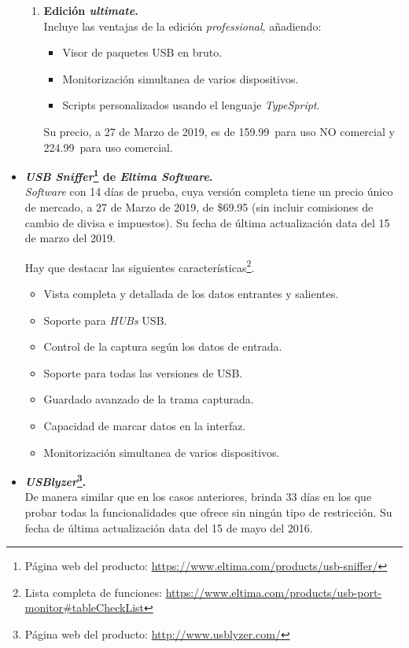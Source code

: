 \begin{itemize}
\begin{enumerate}
        \item \textbf{Edición \emph{ultimate}.} \\
        Incluye las ventajas de la edición \emph{professional}, añadiendo:
        \begin{itemize}
            \item Visor de paquetes USB en bruto.
            \item Monitorización simultanea de varios dispositivos.
            \item Scripts personalizados usando el lenguaje \emph{TypeSpript}.
        \end{itemize}
        Su precio, a 27 de Marzo de 2019, es de 159.99\texteuro ~para uso NO comercial y 224.99\texteuro ~para uso comercial.
    \end{enumerate}

    \item \textbf{\emph{USB Sniffer}\footnote{Página web del producto: \url{https://www.eltima.com/products/usb-sniffer/}} de \emph{Eltima Software}.} \\
    \emph{Software} con 14 días de prueba, cuya versión completa tiene un precio único de mercado, a 27 de Marzo de 2019, de \$69.95 (sin incluir comisiones de cambio de divisa e impuestos). Su fecha de última actualización data del 15 de marzo del 2019.
    
    Hay que destacar las siguientes características\footnote{Lista completa de funciones: \url{https://www.eltima.com/products/usb-port-monitor\#tableCheckList}}.

    \begin{itemize}
        \item Vista completa y detallada de los datos entrantes y salientes.
        \item Soporte para \emph{HUBs} USB.
        \item Control de la captura según los datos de entrada.
        \item Soporte para todas las versiones de USB.
        \item Guardado avanzado de la trama capturada.
        \item Capacidad de marcar datos en la interfaz.
        \item Monitorización simultanea de varios dispositivos.
    \end{itemize}

    \item \textbf{\emph{USBlyzer}\footnote{Página web del producto: \url{http://www.usblyzer.com/}}.} \\
    De manera similar que en los casos anteriores, brinda 33 días en los que probar todas la funcionalidades que ofrece sin ningún tipo de restricción. Su fecha de última actualización data del 15 de mayo del 2016.


\end{itemize}
